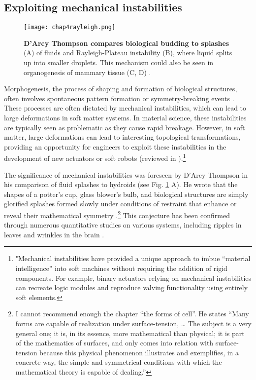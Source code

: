 \hypertarget{exploiting-mechanical-instabilities}{%
	\subsection{Exploiting mechanical
		instabilities}\label{exploiting-mechanical-instabilities}}

\begin{figure}
	\centering
	\texttt{[image: chap4rayleigh.png]}
	\caption{\label{fig_4_4} \textbf{D'Arcy Thompson compares biological budding to splashes} (A) of fluids and Rayleigh-Plateau instability \cite{thompson1979} (B), where liquid splits up into smaller droplets. This mechanism could also be seen in organogenesis of mammary tissue (C, D) \cite{fernandez2021}.}
\end{figure}

Morphogenesis, the process of shaping and formation of biological structures, often involves spontaneous pattern formation or symmetry-breaking events \cite{ishihara2018}. These processes are often dictated by mechanical instabilities, which can lead to large deformations in soft matter systems. In material science, these instabilities are typically seen as problematic as they cause rapid breakage. However, in soft matter, large deformations can lead to interesting topological transformations, providing an opportunity for engineers to exploit these instabilities in the development of new actuators or soft robots (reviewed in \cite{pal2021}).\footnote{"Mechanical instabilities have provided a unique approach to imbue “material intelligence” into soft machines without requiring the addition of rigid components. For example, binary actuators relying on mechanical instabilities can recreate logic modules and reproduce valving functionality using entirely soft elements.}

The significance of mechanical instabilities was foreseen by D'Arcy Thompson in his comparison of fluid splashes to hydroids (see Fig. \ref{fig_4_4} A). He wrote that the shapes of a potter's cup, glass blower's bulb, and biological structures are simply glorified splashes formed slowly under conditions of restraint that enhance or reveal their mathematical symmetry \cite{thompson1979}.\footnote{ I cannot recommend enough the chapter “the forms of cell”. He states “Many forms are capable of realization under surface-tension, … The subject is a very general one; it is, in its essence, more mathematical than physical; it is part of the mathematics of surfaces, and only comes into relation with surface-tension because this physical phenomenon illustrates and exemplifies, in a concrete way, the simple and symmetrical conditions with which the mathematical theory is capable of dealing.”}
This conjecture has been confirmed through numerous quantitative studies on various systems, including ripples in leaves and wrinkles in the brain \cite{liang2009, karzbrun2018}.

